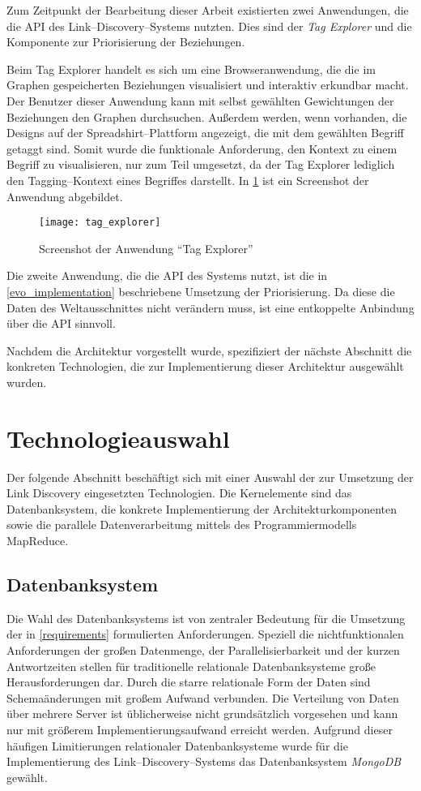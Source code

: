 Zum Zeitpunkt der Bearbeitung dieser Arbeit existierten zwei Anwendungen, die die API des Link--Discovery--Systems nutzten. Dies sind der \emph{Tag Explorer} und die Komponente zur Priorisierung der Beziehungen.

Beim Tag Explorer handelt es sich um eine Browseranwendung, die die im Graphen gespeicherten Beziehungen visualisiert und interaktiv erkundbar macht. Der Benutzer dieser Anwendung kann mit selbst gewählten Gewichtungen der Beziehungen den Graphen durchsuchen. Außerdem werden, wenn vorhanden, die Designs auf der Spreadshirt--Plattform angezeigt, die mit dem gewählten Begriff getaggt sind. Somit wurde die funktionale Anforderung, den Kontext zu einem Begriff zu visualisieren, nur zum Teil umgesetzt, da der Tag Explorer lediglich den Tagging--Kontext eines Begriffes darstellt. In \cref{fig:tag_explorer} ist ein Screenshot der Anwendung abgebildet.

\begin{figure}[ht]
\centering
\texttt{[image: tag\_explorer]}
\caption{Screenshot der Anwendung ``Tag Explorer''}
\label{fig:tag_explorer}
\end{figure}

Die zweite Anwendung, die die API des Systems nutzt, ist die in \cref{evo_implementation} beschriebene Umsetzung der Priorisierung. Da diese die Daten des Weltausschnittes nicht verändern muss, ist eine entkoppelte Anbindung über die API sinnvoll.

Nachdem die Architektur vorgestellt wurde, spezifiziert der nächste Abschnitt die konkreten Technologien, die zur Implementierung dieser Architektur ausgewählt wurden.

\section{Technologieauswahl}
\label{tech}

Der folgende Abschnitt beschäftigt sich mit einer Auswahl der zur Umsetzung der Link Discovery eingesetzten Technologien. Die Kernelemente sind das Datenbanksystem, die konkrete Implementierung der Architekturkomponenten sowie die parallele Datenverarbeitung mittels des Programmiermodells MapReduce.

\subsection{Datenbanksystem}
\label{db_choice}

Die Wahl des Datenbanksystems ist von zentraler Bedeutung für die Umsetzung der in \cref{requirements} formulierten Anforderungen. Speziell die nichtfunktionalen Anforderungen der großen Datenmenge, der Parallelisierbarkeit und der kurzen Antwortzeiten stellen für traditionelle relationale Datenbanksysteme große Herausforderungen dar. Durch die starre relationale Form der Daten sind Schemaänderungen mit großem Aufwand verbunden. Die Verteilung von Daten über mehrere Server ist üblicherweise nicht grundsätzlich vorgesehen und kann nur mit größerem Implementierungsaufwand erreicht werden. Aufgrund dieser häufigen Limitierungen relationaler Datenbanksysteme wurde für die Implementierung des Link--Discovery--Systems das Datenbanksystem \emph{MongoDB} \cite{mo2013} gewählt.

